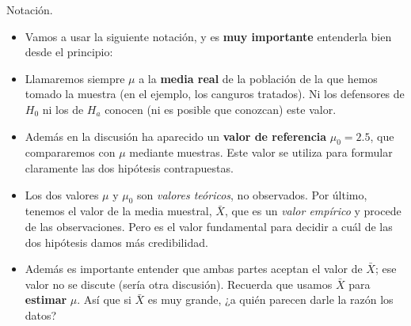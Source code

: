 \documentclass[
  9pt,
  ignorenonframetext,
]{beamer}
\providecommand{\tightlist}{%
  \setlength{\itemsep}{0pt}\setlength{\parskip}{0pt}}
\begin{document}
\begin{frame}{Notación.}
\protect\hypertarget{notacion.}{}

\vspace{2mm}

\begin{itemize}
\tightlist
\item
  Vamos a usar la siguiente notación, y es \textbf{muy importante}
  entenderla bien desde el principio:
\end{itemize}

\vspace{1mm}

\begin{itemize}
\tightlist
\item
  Llamaremos siempre \(\mu\) a la \textbf{media real} de la población de
  la que hemos tomado la muestra (en el ejemplo, los canguros tratados).
  Ni los defensores de \(H_0\) ni los de \(H_a\) conocen (ni es posible
  que conozcan) este valor.
\end{itemize}

\vspace{1mm}

\begin{itemize}
\tightlist
\item
  Además en la discusión ha aparecido un \textbf{valor de referencia}
  \(\mu_0 = 2.5\), que compararemos con \(\mu\) mediante muestras. Este
  valor se utiliza para formular claramente las dos hipótesis
  contrapuestas.
\end{itemize}

\vspace{1mm}

\begin{itemize}
\tightlist
\item
  Los dos valores \(\mu\) y \(\mu_0\) son \emph{valores teóricos}, no
  observados. Por último, tenemos el valor de la media muestral,
  \(\bar X\), que es un \emph{valor empírico} y procede de las
  observaciones. Pero es el valor fundamental para decidir a cuál de las
  dos hipótesis damos más credibilidad.
\end{itemize}

\vspace{1mm}

\begin{itemize}
\tightlist
\item
  Además es importante entender que ambas partes aceptan el valor de
  \(\bar X\); ese valor no se discute (sería otra discusión). Recuerda
  que usamos \(\bar X\) para \textbf{estimar} \(\mu\). Así que si
  \(\bar X\) es muy grande, ¿a quién parecen darle la razón los datos?
\end{itemize}

\end{frame}
\end{document}
